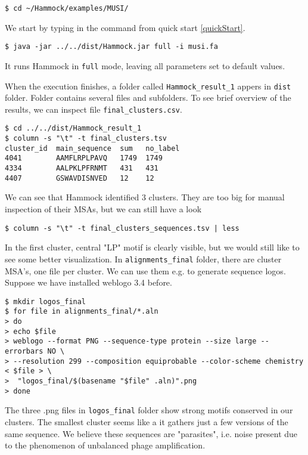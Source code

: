 \documentclass[11pt, a4paper, twoside, titlepage]{article}
\begin{document}
\noindent
\texttt{\$ cd \textasciitilde/Hammock/examples/MUSI/}\newline

We start by typing in the command from quick start \ref{quickStart}.\newline

\noindent
\texttt{\$ java -jar ../../dist/Hammock.jar full -i musi.fa}\newline

It runs Hammock in \texttt{full} mode, leaving all parameters set to default values.

When the execution finishes, a folder called \texttt{Hammock\_result\_1} appers in \texttt{dist} folder. Folder contains several files and subfolders. To see brief overview of the results, we can inspect file \texttt{final\_clusters.csv}.\newline

\begin{verbatim}
$ cd ../../dist/Hammock_result_1
$ column -s "\t" -t final_clusters.tsv
cluster_id  main_sequence  sum   no_label
4041        AAMFLRPLPAVQ   1749  1749
4334        AALPKLPFRNMT   431   431
4407        GSWAVDISNVED   12    12
\end{verbatim}

We can see that Hammock identified 3 clusters. They are too big for manual inspection of their MSAs, but we can still have a look

\begin{verbatim}
$ column -s "\t" -t final_clusters_sequences.tsv | less
\end{verbatim}

In the first cluster, central "LP" motif is clearly visible, but we would still like to see some better visualization. In \texttt{alignments\_final} folder, there are cluster MSA's, one file per cluster. We can use them e.g. to generate sequence logos. Suppose we have installed weblogo 3.4 \cite{Crooks2004} before.

\begin{verbatim}
$ mkdir logos_final
$ for file in alignments_final/*.aln
> do
> echo $file
> weblogo --format PNG --sequence-type protein --size large --errorbars NO \ 
> --resolution 299 --composition equiprobable --color-scheme chemistry < $file > \
>  "logos_final/$(basename "$file" .aln)".png
> done 
\end{verbatim}

The three .png files in \texttt{logos\_final} folder show strong motifs conserved in our clusters. The smallest cluster seems like a it gathers just a few versions of the same sequence. We believe these sequences are "parasites", i.e. noise present due to the phenomenon of unbalanced phage amplification. 
\end{document}
